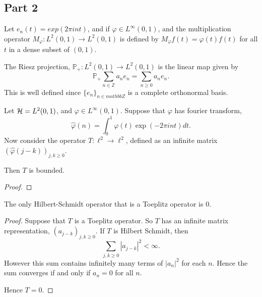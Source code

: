 \documentclass{unswmaths}
\begin{document}
\subsection*{Part 2}
\begin{definition}
    Let $e_n(t) = exp(2\pi i n t)$, and if $\varphi \in L^\infty(0,1)$,
    and the multiplication operator $M_\varphi:L^2(0,1)\rightarrow L^2(0,1)$ is defined by $M_\varphi f(t) = \varphi(t)f(t)$
    for all $t$ in a dense subset of $(0,1)$.    
\end{definition}
\begin{definition}
    The Riesz projection, $\mathbb{P}_+:L^2(0,1)\rightarrow L^2(0,1)$ is the linear map given by
    \begin{equation*}
        \mathbb{P}_+\sum_{n\in\mathbb{Z}} a_ne_n = \sum_{n\geq 0} a_ne_n.
    \end{equation*}
    This is well defined since $\{e_n\}_{n\in mathbb{Z}}$ is a complete orthonormal basis.
\end{definition}
\begin{lemma}
    Let $\mathcal{H} = L^2(0,1)$, and $\varphi \in L^\infty(0,1)$. Suppose that $\varphi$
    has fourier transform,
    \begin{equation*}
        \hat{\varphi}(n) = \int_0^1 \varphi(t)\exp(-2\pi i nt)dt.
    \end{equation*}
    Now consider the operator $T:\ell^2\rightarrow \ell^2$, defined as an infinite matrix $(\hat{\varphi}(j-k))_{j,k\geq 0}$.
    
    Then $T$ is bounded.
\end{lemma}
\begin{proof}
    
\end{proof}

\begin{theorem}
    The only Hilbert-Schmidt operator that is a Toeplitz operator
    is $0$.
\end{theorem}
\begin{proof}
    Suppose that $T$ is a Toeplitz operator. So $T$ has an infinite matrix
    representation, $(a_{j-k})_{j,k\geq 0}$. If $T$ is Hilbert Schmidt, then
    \begin{equation*}
        \sum_{j,k\geq 0} |a_{j-k}|^2 < \infty.
    \end{equation*}
    However this sum contains infinitely many terms of $|a_n|^2$ for each $n$.
    Hence the sum converges if and only if $a_n = 0$ for all $n$.
    
    Hence $T = 0$.
\end{proof} 
\end{document}
